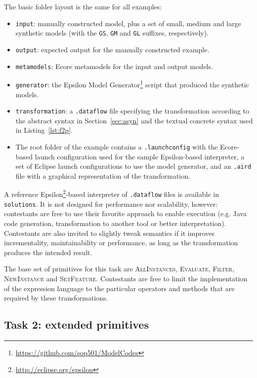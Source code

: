 \documentclass[a4paper]{scrartcl}
\newcommand*{\class}[1]{\textsc{#1}}
\newcommand*{\file}[1]{\texttt{#1}}
\begin{document}
The basic folder layout is the same for all examples:
\begin{itemize}
\item \file{input}: manually constructed model, plus a set of small,
  medium and large synthetic models (with the \file{GS}, \file{GM} and
  \file{GL} suffixes, respectively).
\item \file{output}: expected output for the manually constructed
  example.
\item \file{metamodels}: Ecore metamodels for the input and output
  models.
\item \file{generator}: the Epsilon Model
  Generator\footnote{\url{https://github.com/sop501/ModelCodes}}
  script that produced the synthetic models.
\item \file{transformation}: a \file{.dataflow} file specifying the
  transformation according to the abstract syntax in
  Section~\ref{sec:asyn} and the textual concrete syntax used in
  Listing~\ref{lst:f2p}.
\item The root folder of the example contains a \file{.launchconfig}
  with the Ecore-based launch configuration used for the sample
  Epsilon-based interpreter, a set of Eclipse launch configurations to
  use the model generator, and an \file{.aird} file with a graphical
  representation of the transformation.
\end{itemize}

A reference Epsilon\footnote{\url{http://eclipse.org/epsilon}}-based
interpreter of \file{.dataflow} files is available in
\file{solutions}. It is not designed for performance nor scalability,
however: contestants are free to use their favorite approach to enable
execution (e.g. Java code generation, transformation to another tool
or better interpretation). Contestants are also invited to slightly
tweak semantics if it improves incrementality, maintainability or
performance, as long as the transformation produces the intended
result.

The base set of primitives for this task are \class{AllInstances},
\class{Evaluate}, \class{Filter}, \class{NewInstance} and
\class{SetFeature}. Contestants are free to limit the implementation
of the expression language to the particular operators and methods
that are required by these transformations.


\subsection{Task 2: extended primitives}
\label{sec:extprim}
\end{document}
